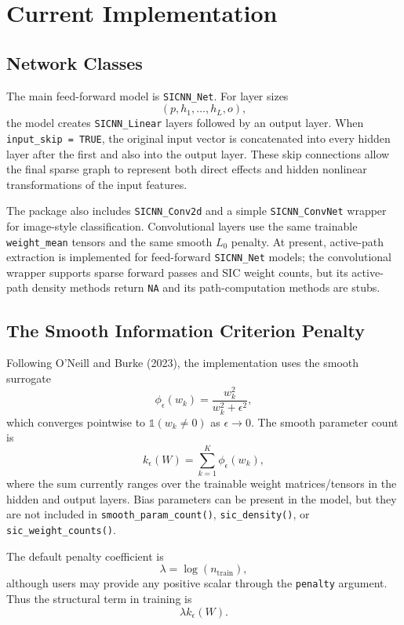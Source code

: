 \documentclass{article}
\begin{document}
\section{Current Implementation}
\subsection{Network Classes}
The main feed-forward model is \texttt{SICNN\_Net}. For layer sizes
\[
(p,h_1,\ldots,h_L,o),
\]
the model creates \texttt{SICNN\_Linear} layers followed by an output layer. When \texttt{input\_skip = TRUE}, the original input vector is concatenated into every hidden layer after the first and also into the output layer. These skip connections allow the final sparse graph to represent both direct effects and hidden nonlinear transformations of the input features.

The package also includes \texttt{SICNN\_Conv2d} and a simple \texttt{SICNN\_ConvNet} wrapper for image-style classification. Convolutional layers use the same trainable \texttt{weight\_mean} tensors and the same smooth $L_0$ penalty. At present, active-path extraction is implemented for feed-forward \texttt{SICNN\_Net} models; the convolutional wrapper supports sparse forward passes and SIC weight counts, but its active-path density methods return \texttt{NA} and its path-computation methods are stubs.

\subsection{The Smooth Information Criterion Penalty}
Following O'Neill and Burke (2023), the implementation uses the smooth surrogate
\begin{equation}
\phi_\epsilon(w_k) = \frac{w_k^2}{w_k^2+\epsilon^2},
\end{equation}
which converges pointwise to $\mathbb{1}(w_k \neq 0)$ as $\epsilon \to 0$. The smooth parameter count is
\begin{equation}
k_\epsilon(W)=\sum_{k=1}^K \phi_\epsilon(w_k),
\end{equation}
where the sum currently ranges over the trainable weight matrices/tensors in the hidden and output layers. Bias parameters can be present in the model, but they are not included in \texttt{smooth\_param\_count()}, \texttt{sic\_density()}, or \texttt{sic\_weight\_counts()}.

The default penalty coefficient is
\begin{equation}
\lambda = \log(n_{\mathrm{train}}),
\end{equation}
although users may provide any positive scalar through the \texttt{penalty} argument. Thus the structural term in training is
\begin{equation}
\lambda k_\epsilon(W).
\end{equation}
\end{document}
